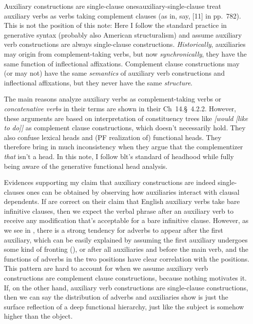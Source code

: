 \documentclass[UTF8, a4paper, oneside, scheme=plain]{ctexrep}
\newcommand*{\citesec}[1]{\S~{#1}}
\newcommand*{\citechap}[1]{Ch~{#1}}
\newcommand*{\citepage}[1]{pp.~{#1}}
\newcommand*{\citechapsec}[2]{\citechap{#1}.\citesec{#2}}
\newcommand*{\term}[1]{\emph{#1}}
\newcommand{\corpus}[1]{\emph{#1}}
\begin{document}
\begin{infobox}{Auxiliary constructions are single-clause ones}{auxiliary-single-clause}
    \citet{cgel} treat auxiliary verbs as verbs taking complement clauses 
    (as in, say, [11] in \citepage{782}).
    This is not the position of this note:
    Here I follow the standard practice in generative syntax (probably also American structuralism) 
    and assume auxiliary verb constructions are always single-clause constructions.
    \emph{Historically}, auxiliaries may origin from complement-taking verbs,
    but now \emph{synchronically}, they have the same function of inflectional affixations.
    Complement clause constructions may (or may not) have the same \emph{semantics} of 
    auxiliary verb constructions and inflectional affixations,
    but they never have the same \emph{structure}.

    The main reasons \citet{cgel} analyze auxiliary verbs as complement-taking verbs or
    \term{concatenative verbs} in their terms 
    are shown in their \citechapsec{14}{4.2.2}.
    However, these arguments are based on interpretation of constituency trees like
    \corpus{[would [like to do]]} as complement clause constructions,
    which doesn't necessarily hold.
    They also confuse lexical heads and (PF realization of) functional heads.
    They therefore bring in much inconsistency when they argue that 
    the complementizer \corpus{that} isn't a head.
    In this note, I follow \acs{blt}'s standard of headhood
    while fully being aware of the generative functional head analysis.

    Evidences supporting my claim that auxiliary constructions are indeed single-clauses ones 
    can be obtained by observing how auxiliaries interact with clausal dependents.
    If \citet{cgel} are correct on their claim that English auxiliary verbs take bare infinitive clauses,
    then we expect the verbal phrase after an auxiliary verb to receive any modification 
    that's acceptable for a bare infinitive clause.
    However, as we see in ,
    there is a strong tendency for adverbs to appear after the first auxiliary,
    which can be easily explained by assuming the first auxiliary 
    undergoes some kind of fronting (),
    or after all auxiliaries and before the main verb,
    and the functions of adverbs in the two positions 
    have clear correlation with the positions.
    This pattern are hard to account for 
    when we assume auxiliary verb constructions are complement clause constructions,
    because nothing motivates it.
    If, on the other hand, 
    auxiliary verb constructions are single-clause constructions,
    then we can say the distribution of adverbs and auxiliaries
    show is just the surface reflection of a deep functional hierarchy,
    just like the subject is somehow higher than the object.
\end{infobox}
\end{document}
